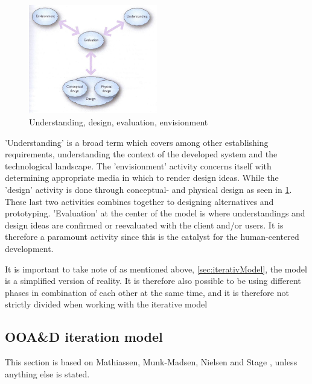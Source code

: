 \begin{figure}[H]
	\centering
	\includegraphics[width=0.5\textwidth]{billeder/DEBModel.jpg}
	\caption{Understanding, design, evaluation, envisionment \citep[p.~49]{Benyon}}\label{fig:DEBModel}
\end{figure}
'Understanding' is a broad term which covers among other establishing requirements, understanding the context of the developed system and the technological landscape.
The 'envisionment' activity concerns itself with determining appropriate media in which to render design ideas.
While the 'design' activity is done through conceptual- and physical design as seen in \cref{fig:DEBModel}.
These last two activities combines together to designing alternatives and prototyping.
'Evaluation' at the center of the model is where understandings and design ideas are confirmed or reevaluated with the client and/or users.
It is therefore a paramount activity since this is the catalyst for the human-centered development.

It is important to take note of as mentioned above, \cref{sec:iterativModel}, the model is a simplified version of reality.
It is therefore also possible to be using different phases in combination of each other at the same time, and it is therefore not strictly divided when working with the iterative model

\subsection{OOA\&D iteration model}\label{sec:Iterative3}
This section is based on Mathiassen, Munk-Madsen, Nielsen and Stage \cite{Rod-Aalborg}, unless anything else is stated.

